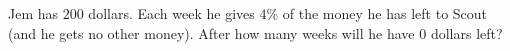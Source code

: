 Jem has $200$ dollars. Each week he gives $4\%$ of the money he has left to Scout (and he gets no other money). After how many weeks will he have $0$ dollars left?
